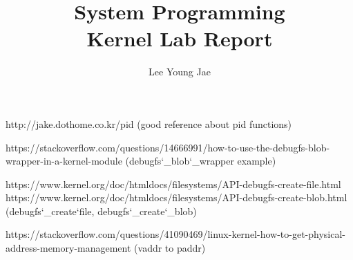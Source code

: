 \documentclass[a4paper,12pt,twoside]{report}
\begin{document}
\title{System Programming\\Kernel Lab Report\\}

\author{Lee Young Jae}

\normallinespacing %
\maketitle


\body
\linespread{1}




\appendix


% 
% 

\begin{thebibliography}{9}
http://jake.dothome.co.kr/pid
(good reference about pid functions)

https://stackoverflow.com/questions/14666991/how-to-use-the-debugfs-blob-wrapper-in-a-kernel-module
(debugfs\char`_blob\char`_wrapper example)

https://www.kernel.org/doc/htmldocs/filesystems/API-debugfs-create-file.html\\
https://www.kernel.org/doc/htmldocs/filesystems/API-debugfs-create-blob.html\\
(debugfs\char`_create\char`file, debugfs\char`_create\char`_blob)

https://stackoverflow.com/questions/41090469/linux-kernel-how-to-get-physical-address-memory-management
(vaddr to paddr)

\end{thebibliography}
\end{document}
